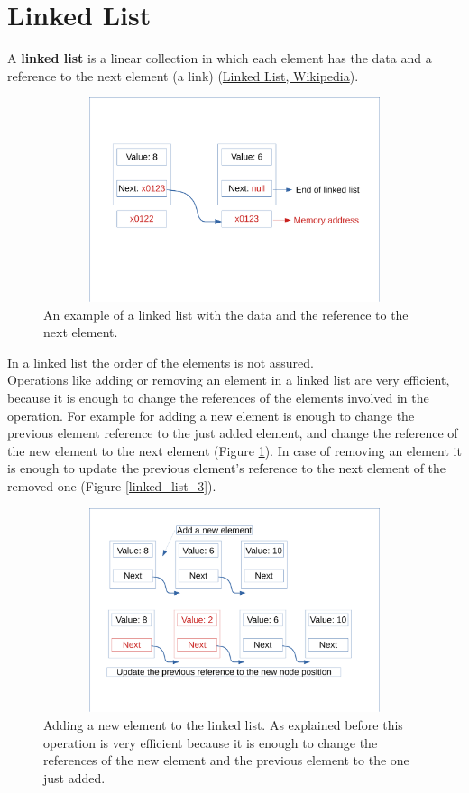 \newpage
\section{Linked List}
A \textbf{linked list} is a linear collection in which each element has the data and a reference to the next element (a link) \cite{wikilinkedlist} (\href{https://en.wikipedia.org/wiki/Linked_list}{Linked List, Wikipedia}). 
\begin{figure}[hb]
	\includegraphics[width=14cm,height=6cm]{chapters/datastructures/images/linked_list_1.pdf}
	\caption[]{An example of a linked list with the data and the reference to the next element.}
\end{figure}
In a linked list the order of the elements is not assured. 
\\
Operations like adding or removing an element in a linked list are very efficient, because it is enough to change the references of the elements involved in the operation. For example for adding a new element is enough to change the previous element reference to the just added element, and change the reference of the new element to the next element (Figure \ref{linked_list_2}). In case of removing an element it is enough to update the previous element's reference to the next element of the removed one (Figure \ref{linked_list_3}). 
\begin{figure}[h]
	\includegraphics[width=14cm,height=6cm]{chapters/datastructures/images/linked_list_2_1.pdf}
	\caption[]{Adding a new element to the linked list. As explained before this operation is very efficient because it is enough to change the references of the new element and the previous element to the one just added.}
	\label{linked_list_2}
\end{figure}
